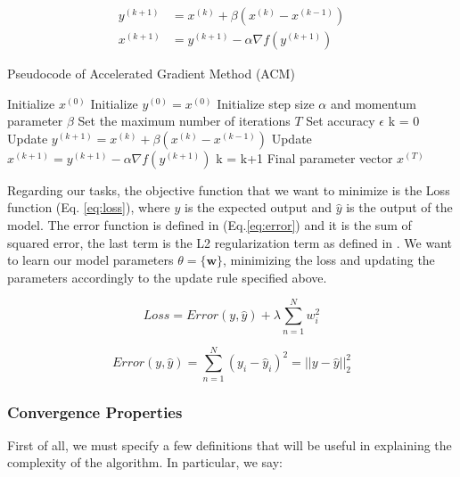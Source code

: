 \begin{equation}
\label{eq:updateruleacm}
\begin{aligned}
y^{(k+1)} &= x^{(k)} + \beta (x^{(k)} - x^{(k-1)}) \\
x^{(k+1)} &= y^{(k+1)} -\alpha \nabla f(y^{(k+1)})    
\end{aligned}
\end{equation}

\begin{algorithm}
\caption{Pseudocode of Accelerated Gradient Method (ACM)}
\label{alg:ACG}
\begin{algorithmic}[1]
\STATE Initialize $x^{(0)}$ 
\STATE Initialize $y^{(0)} = x^{(0)}$ 
\STATE Initialize step size $\alpha$ and  momentum parameter $\beta$
\STATE Set the maximum number of iterations $T$
\STATE Set accuracy $\epsilon$
\STATE k = 0
    \STATE Update $y^{(k+1)} = x^{(k)} + \beta (x^{(k)} - x^{(k-1)}) $ 
    \STATE Update $x^{(k+1)} = y^{(k+1)} -\alpha \nabla f(y^{(k+1)})$ 
    \STATE k = k+1
\ENDWHILE
\RETURN Final parameter vector $x^{(T)}$
\end{algorithmic}
\end{algorithm}


Regarding our tasks, the objective function that we want to minimize is the Loss function (Eq. \ref{eq:loss}), where $y$ is the expected output and $\hat{y}$ is the output of the model. The error function is defined in (Eq.\ref{eq:error}) and it is the sum of squared error, the last term is the L2 regularization term as defined in \cite{ridge_reg}.  We want to learn our model parameters $\theta = \{\textbf{w}\}$, minimizing the loss and updating the parameters accordingly to the update rule specified above. 

\begin{equation}
\label{eq:loss}
Loss = Error(y,\hat{y}) + \lambda \sum_{n=1}^{N} w_i^2
\end{equation}

\begin{equation}
\label{eq:error}
Error(y, \hat{y}) = \sum_{n=1}^{N}(y_i - \hat{y}_i)^2 = || y - \hat{y} ||_2^2
\end{equation}


\subsubsection{Convergence Properties}
First of all, we must specify a few definitions that will be useful in explaining the complexity of the algorithm. In particular, we say:

